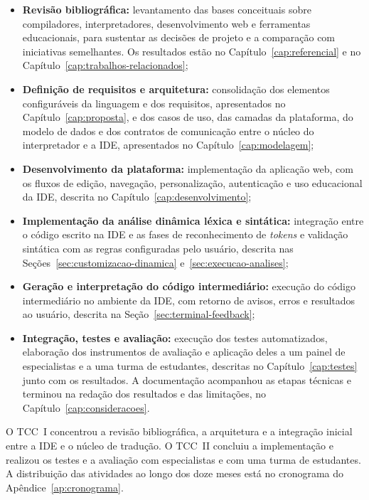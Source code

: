 \begin{itemize}
    \item \textbf{Revisão bibliográfica:} levantamento das bases conceituais sobre compiladores, interpretadores, desenvolvimento web e ferramentas educacionais, para sustentar as decisões de projeto e a comparação com iniciativas semelhantes. Os resultados estão no Capítulo~\ref{cap:referencial} e no Capítulo~\ref{cap:trabalhos-relacionados};
    \item \textbf{Definição de requisitos e arquitetura:} consolidação dos elementos configuráveis da linguagem e dos requisitos, apresentados no Capítulo~\ref{cap:proposta}, e dos casos de uso, das camadas da plataforma, do modelo de dados e dos contratos de comunicação entre o núcleo do interpretador e a IDE, apresentados no Capítulo~\ref{cap:modelagem};
    \item \textbf{Desenvolvimento da plataforma:} implementação da aplicação web, com os fluxos de edição, navegação, personalização, autenticação e uso educacional da IDE, descrita no Capítulo~\ref{cap:desenvolvimento};
    \item \textbf{Implementação da análise dinâmica léxica e sintática:} integração entre o código escrito na IDE e as fases de reconhecimento de \textit{tokens} e validação sintática com as regras configuradas pelo usuário, descrita nas Seções~\ref{sec:customizacao-dinamica} e~\ref{sec:execucao-analises};
    \item \textbf{Geração e interpretação do código intermediário:} execução do código intermediário no ambiente da IDE, com retorno de avisos, erros e resultados ao usuário, descrita na Seção~\ref{sec:terminal-feedback};
    \item \textbf{Integração, testes e avaliação:} execução dos testes automatizados, elaboração dos instrumentos de avaliação e aplicação deles a um painel de especialistas e a uma turma de estudantes, descritas no Capítulo~\ref{cap:testes} junto com os resultados. A documentação acompanhou as etapas técnicas e terminou na redação dos resultados e das limitações, no Capítulo~\ref{cap:consideracoes}.
\end{itemize}

O TCC~I concentrou a revisão bibliográfica, a arquitetura e a integração inicial entre a IDE e o núcleo de tradução. O TCC~II concluiu a implementação e realizou os testes e a avaliação com especialistas e com uma turma de estudantes. A distribuição das atividades ao longo dos doze meses está no cronograma do Apêndice~\ref{ap:cronograma}.

